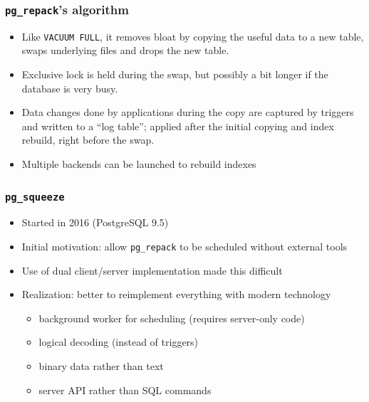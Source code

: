 \begin{frame}
  \frametitle{\texttt{pg\_repack}'s algorithm}
  \begin{itemize}
    \item Like \texttt{VACUUM FULL}, it removes bloat by copying the
      useful data to a new table, swaps underlying files and drops the new
      table.
    \item Exclusive lock is held during the swap, but possibly a bit longer if
      the database is very busy.
    \item Data changes done by applications during the copy are captured by
      triggers and written to a ``log table'';
      applied after the initial copying and index rebuild, right before the swap.
    \item Multiple backends can be launched to rebuild indexes
  \end{itemize}
\end{frame}

\begin{frame}
  \frametitle{\texttt{pg\_squeeze}}
  \begin{itemize}
    \item Started in 2016 (PostgreSQL 9.5)
    \item Initial motivation: allow \texttt{pg\_repack} to be scheduled without external tools
    \item Use of dual client/server implementation made this difficult
    \item Realization: better to reimplement everything with modern technology
      \begin{itemize}
	\item background worker for scheduling (requires server-only code)
	\item logical decoding (instead of triggers)
        \item binary data rather than text
        \item server API rather than SQL commands
      \end{itemize}
  \end{itemize}
\end{frame}

